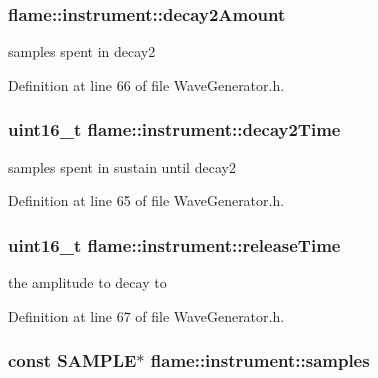 \hypertarget{structflame_1_1instrument_a294a5d9d9d10c3706d2fe362e31fc93c}{
\subsubsection[{decay2\-Amount}]{ flame\-::instrument\-::decay2\-Amount}}\label{structflame_1_1instrument_a294a5d9d9d10c3706d2fe362e31fc93c}
samples spent in decay2 

Definition at line 66 of file Wave\-Generator.\-h.

\hypertarget{structflame_1_1instrument_a31be3cd286103e4364edf36133aeec14}{
\subsubsection[{decay2\-Time}]{\setlength{\rightskip}{0pt plus 5cm}uint16\-\_\-t flame\-::instrument\-::decay2\-Time}}\label{structflame_1_1instrument_a31be3cd286103e4364edf36133aeec14}
samples spent in sustain until decay2 

Definition at line 65 of file Wave\-Generator.\-h.

\hypertarget{structflame_1_1instrument_a40807d7de06391d048f1fff8cfe98964}{
\subsubsection[{release\-Time}]{\setlength{\rightskip}{0pt plus 5cm}uint16\-\_\-t flame\-::instrument\-::release\-Time}}\label{structflame_1_1instrument_a40807d7de06391d048f1fff8cfe98964}
the amplitude to decay to 

Definition at line 67 of file Wave\-Generator.\-h.

\hypertarget{structflame_1_1instrument_ad8ca175683ca6f0ebd472cf13051929f}{
\subsubsection[{samples}]{\setlength{\rightskip}{0pt plus 5cm}const {\bf S\-A\-M\-P\-L\-E}$\ast$ flame\-::instrument\-::samples}}\label{structflame_1_1instrument_ad8ca175683ca6f0ebd472cf13051929f}


